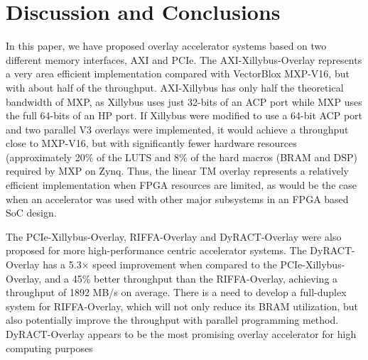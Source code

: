 \section{Discussion and Conclusions}
In this paper, we have proposed overlay accelerator systems based on two different memory interfaces, AXI and PCIe. 
The AXI-Xillybus-Overlay represents a very area efficient implementation compared with VectorBlox MXP-V16, but with about half of the throughput. 
AXI-Xillybus has only half the theoretical bandwidth of MXP, as Xillybus uses just 32-bits of an ACP port while MXP uses the full 64-bits of an HP port. 
If Xillybus were modified to use a 64-bit ACP port and two parallel V3 overlays were implemented, it would achieve a throughput close to MXP-V16, but with significantly fewer hardware resources (approximately 20\% of the LUTS and 8\% of the hard macros (BRAM and DSP) required by MXP on Zynq.
Thus, the linear TM overlay represents a relatively efficient implementation when FPGA resources are limited, as would be the case when an accelerator was used with other major subsystems in an FPGA based SoC design.

The PCIe-Xillybus-Overlay, RIFFA-Overlay and DyRACT-Overlay were also proposed for more high-performance centric accelerator systems. 
The DyRACT-Overlay has a 5.3$\times$ speed improvement when compared to the PCIe-Xillybus-Overlay, and a 45\% better throughput than the RIFFA-Overlay, achieving a throughput of 1892 MB/s on average. 
There is a need to develop a full-duplex system for RIFFA-Overlay, which will not only reduce its BRAM utilization, but also potentially improve the throughput with parallel programming method. 
DyRACT-Overlay appears to be the most promising overlay accelerator for high computing purposes
